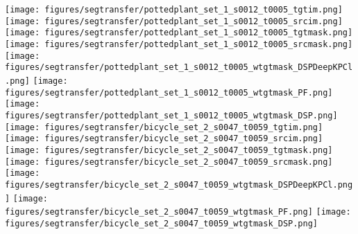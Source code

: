 \documentclass[10pt,twocolumn,letterpaper]{article}
\begin{document}
\begin{figure*}[t]
\begin{center}


  \texttt{[image: figures/segtransfer/pottedplant\_set\_1\_s0012\_t0005\_tgtim.png]}
  \texttt{[image: figures/segtransfer/pottedplant\_set\_1\_s0012\_t0005\_srcim.png]}
  \texttt{[image: figures/segtransfer/pottedplant\_set\_1\_s0012\_t0005\_tgtmask.png]}
  \texttt{[image: figures/segtransfer/pottedplant\_set\_1\_s0012\_t0005\_srcmask.png]}
  \texttt{[image: figures/segtransfer/pottedplant\_set\_1\_s0012\_t0005\_wtgtmask\_DSPDeepKPCl.png]}
  \texttt{[image: figures/segtransfer/pottedplant\_set\_1\_s0012\_t0005\_wtgtmask\_PF.png]}
  \texttt{[image: figures/segtransfer/pottedplant\_set\_1\_s0012\_t0005\_wtgtmask\_DSP.png]}
\\


  \texttt{[image: figures/segtransfer/bicycle\_set\_2\_s0047\_t0059\_tgtim.png]}
  \texttt{[image: figures/segtransfer/bicycle\_set\_2\_s0047\_t0059\_srcim.png]}
  \texttt{[image: figures/segtransfer/bicycle\_set\_2\_s0047\_t0059\_tgtmask.png]}
  \texttt{[image: figures/segtransfer/bicycle\_set\_2\_s0047\_t0059\_srcmask.png]}
  \texttt{[image: figures/segtransfer/bicycle\_set\_2\_s0047\_t0059\_wtgtmask\_DSPDeepKPCl.png]}
  \texttt{[image: figures/segtransfer/bicycle\_set\_2\_s0047\_t0059\_wtgtmask\_PF.png]}
  \texttt{[image: figures/segtransfer/bicycle\_set\_2\_s0047\_t0059\_wtgtmask\_DSP.png]}
\\


\end{center}
\end{figure*}
\end{document}
